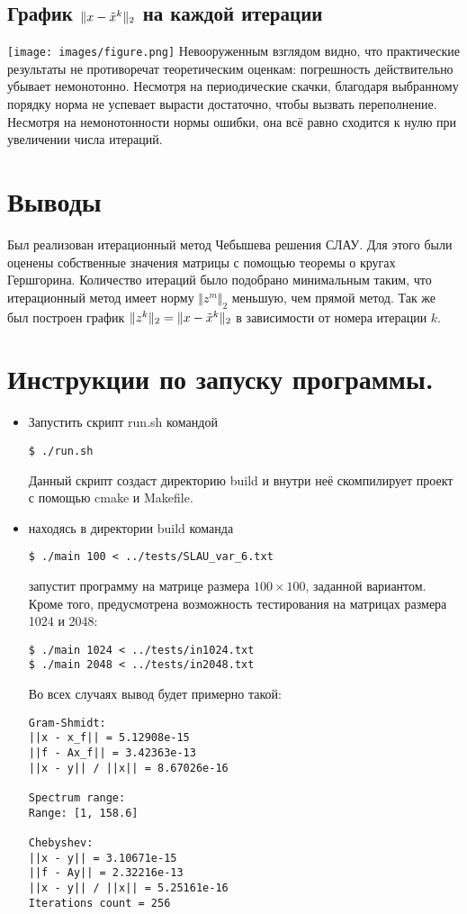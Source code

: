 \documentclass[a4paper,12pt,titlepage,final]{article}
\begin{document}
\subsection{График $\Vert x - \Tilde{x}^k \Vert_2$ на каждой итерации}

\hspace{-3.3cm}
\texttt{[image: images/figure.png]}
Невооруженным взглядом видно, что практические результаты не противоречат теоретическим оценкам: погрешность действительно убывает немонотонно. Несмотря на периодические скачки, благодаря выбранному порядку норма не успевает вырасти достаточно, чтобы вызвать переполнение. Несмотря на немонотонности нормы ошибки, она всё равно сходится к нулю при увеличении числа итераций.
\section{Выводы}
Был реализован итерационный метод Чебышева решения СЛАУ. Для этого были оценены собственные значения матрицы с помощью теоремы о кругах Гершгорина. Количество итераций было подобрано минимальным таким, что итерационный метод имеет норму $\Vert z^m \Vert_2$ меньшую, чем прямой метод. Так же был построен график $\Vert z^k \Vert_2 = \Vert x - \Tilde{x}^k \Vert_2$ в зависимости от номера итерации $k$.
\section{Инструкции по запуску программы.}
\begin{itemize}
    \item Запустить скрипт run.sh командой 
\begin{lstlisting}
$ ./run.sh 
\end{lstlisting} 
Данный скрипт создаст директорию build и внутри неё скомпилирует проект с помощью cmake и Makefile. 
    \item находясь в директории build команда 
\begin{lstlisting}
$ ./main 100 < ../tests/SLAU_var_6.txt
\end{lstlisting} 
    запустит программу на матрице размера $100 \times 100$, заданной вариантом. Кроме того, предусмотрена возможность тестирования на матрицах размера 1024 и 2048:
\begin{lstlisting}
$ ./main 1024 < ../tests/in1024.txt
$ ./main 2048 < ../tests/in2048.txt
\end{lstlisting} 
Во всех случаях вывод будет примерно такой:
\begin{lstlisting}
Gram-Shmidt:
||x - x_f|| = 5.12908e-15
||f - Ax_f|| = 3.42363e-13
||x - y|| / ||x|| = 8.67026e-16

Spectrum range:
Range: [1, 158.6]

Chebyshev:
||x - y|| = 3.10671e-15
||f - Ay|| = 2.32216e-13
||x - y|| / ||x|| = 5.25161e-16
Iterations count = 256
\end{lstlisting}
\end{itemize}
\end{document}
